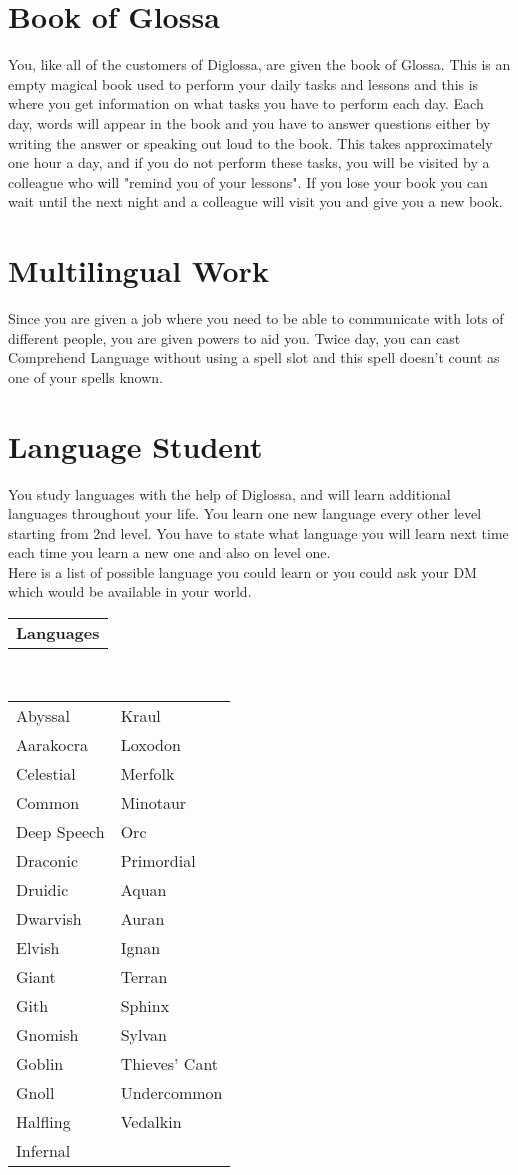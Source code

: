 \documentclass[11pt, A4paper, english]{article}
\begin{document}
	\section*{Book of Glossa}
You, like all of the customers of Diglossa, are given the book of Glossa. This is an empty magical book used to perform your daily tasks and lessons and this is where you get information on what tasks you have to perform each day. Each day, words will appear in the book and you have to answer questions either by writing the answer or speaking out loud to the book. This takes approximately one hour a day, and if you do not perform these tasks, you will be visited by a colleague who will "remind you of your lessons". If you lose your book you can wait until the next night and a colleague will visit you and give you a new book.

	\section*{Multilingual Work}
Since you are given a job where you need to be able to communicate with lots of different people, you are given powers to aid you. Twice day, you can cast Comprehend Language without using a spell slot and this spell doesn't count as one of your spells known.

	\section*{Language Student}
You study languages with the help of Diglossa, and will learn additional languages throughout your life. You learn one new language every other level starting from 2nd level. You have to state what language you will learn next time each time you learn a new one and also on level one. \\
Here is a list of possible language you could learn or you could ask your DM which would be available in your world. \\
		\begin{tabular}{l}
\textbf{Languages}
		\end{tabular} \\
		\begin{tabular}{l|l}
\hline
Abyssal & Kraul \\
Aarakocra & Loxodon \\
Celestial & Merfolk \\
Common & Minotaur \\
Deep Speech & Orc \\
Draconic & Primordial \\
Druidic & \indent Aquan \\
Dwarvish & \indent Auran \\
Elvish & \indent Ignan \\
Giant & \indent Terran \\
Gith & Sphinx \\
Gnomish & Sylvan \\
Goblin & Thieves' Cant \\
Gnoll & Undercommon\\
Halfling & Vedalkin \\
Infernal & \\
		\end{tabular}
\end{document}
